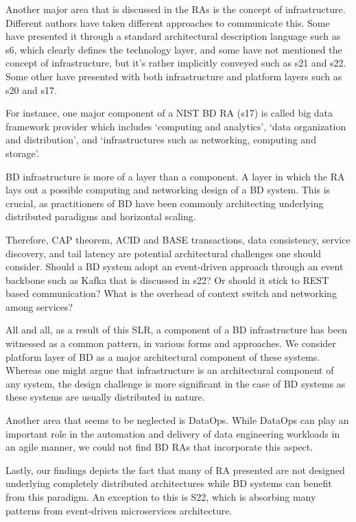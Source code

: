 \documentclass{ieeeaccess}
\begin{document}
Another major area that is discussed in the RAs is the concept of infrastructure. Different authors have taken different approaches to communicate this. Some have presented it through a standard architectural description language such as s6, which clearly defines the technology layer, and some have not mentioned the concept of infrastructure, but it's rather implicitly conveyed such as s21 and s22. Some other have presented with both infrastructure and platform layers such as s20 and s17. 

For instance, one major component of a NIST BD RA (s17) is called big data framework provider which includes ‘computing and analytics’, ‘data organization and distribution’, and ‘infrastructures such as networking, computing and storage’.  

BD infrastructure is more of a layer than a component. A layer in which the RA lays out a possible computing and networking design of a BD system. This is crucial, as practitioners of BD have been commonly architecting underlying distributed paradigms and horizontal scaling. 

Therefore, CAP theorem, ACID and BASE transactions, data consistency, service discovery, and tail latency are potential architectural challenges one should consider. Should a BD system adopt an event-driven approach through an event backbone such as Kafka that is discussed in s22? Or should it stick to REST based communication? What is the overhead of context switch and networking among services?  

All and all, as a result of this SLR, a component of a BD infrastructure has been witnessed as a common pattern, in various forms and approaches. We consider platform layer of BD as a major architectural component of these systems. Whereas one might argue that infrastructure is an architectural component of any system, the design challenge is more significant in the case of BD systems as these systems are usually distributed in nature.

Another area that seems to be neglected is DataOps. While DataOps can play an important role in the automation and delivery of data engineering workloads in an agile manner, we could not find BD RAs that incorporate this aspect.

Lastly, our findings depicts the fact that many of RA presented are not designed underlying completely distributed architectures while BD systems can benefit from this paradigm. An exception to this is S22, which is absorbing many patterns from event-driven microservices architecture.
\end{document}
